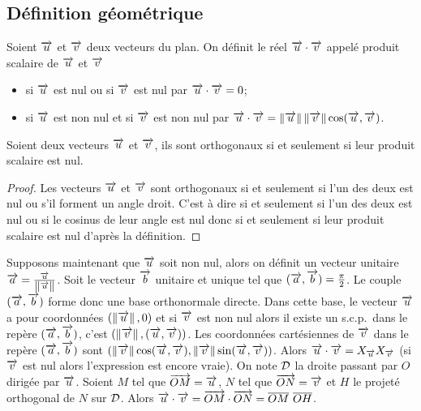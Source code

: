 \subsection{Définition géométrique}
\begin{defdef}
  Soient \(\vu\) et \(\vv\) deux vecteurs du plan. On définit le réel \(\vu \cdot \vv\) appelé produit scalaire de \(\vu\) et \(\vv\) 
  \begin{itemize}
  \item si \(\vu\) est nul ou si \(\vv\) est nul par \(\vu \cdot \vv=0\);
  \item si \(\vu\) est non nul et si \(\vv\) est non nul par \(\vu \cdot \vv=\norme{\vu}\norme{\vv}\cos(\vu, \vv)\).
  \end{itemize}
\end{defdef}
\begin{prop}
   Soient deux vecteurs \(\vu\) et \(\vv\), ils sont orthogonaux si et seulement si leur produit scalaire est nul.
\end{prop}
\begin{proof}
Les vecteurs \(\vu\) et \(\vv\) sont orthogonaux si et seulement si l'un des deux est nul ou s'il forment un angle droit. C'est à dire si et seulement si l'un des deux est nul ou si le cosinus de leur angle est nul donc si et seulement si leur produit scalaire est nul d'après la définition.
\end{proof}

Supposons maintenant que \(\vu\) soit non nul, alors on définit un vecteur unitaire \(\vect{a}=\frac{\vu}{\norme{\vu}}\). Soit le vecteur \(\vect{b}\) unitaire et unique tel que \((\vect{a},\vect{b})=\frac{\pi}{2}\). Le couple \((\vect{a},\vect{b})\) forme donc une base orthonormale directe. Dans cette base, le vecteur \(\vu\) a pour coordonnées \((\norme{\vu},0)\) et si \(\vv\) est non nul alors il existe un s.c.p.\ dans le repère \((\vect{a},\vect{b})\), c'est \((\norme{\vv}, (\vu,\vv))\). Les coordonnées cartésiennes de \(\vv\) dans le repère \((\vect{a},\vect{b})\) sont \((\norme{\vv}\cos(\vu,\vv),\norme{\vv}\sin(\vu,\vv))\). Alors \(\vu \cdot \vv=X_{\vu}X_{\vv}\) (si \(\vv\) est nul alors l'expression est encore vraie). On note \(\Dr\) la droite passant par \(O\) dirigée par \(\vu\). Soient \(M\) tel que \(\vect{OM}=\vu\), \(N\) tel que \(\vect{ON}=\vv\) et \(H\) le projeté orthogonal de \(N\) sur \(\Dr\). Alors \(\vu \cdot \vv=\vect{OM} \cdot \vect{ON}= \overline{OM}~\overline{OH}\).

